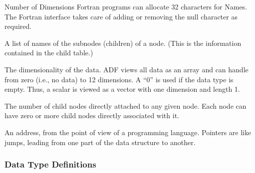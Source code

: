 \begin{Ventryi}{Number of Dimensions}
      Fortran programs can allocate 32 characters for Names.
      The Fortran interface takes care of adding or removing the null
      character as required.
\item [Names of Subnodes]
      A list of names of the subnodes (children) of a node.
      (This is the information contained in the child table.)
\item [Number of Dimensions]
      The dimensionality of the data.
      ADF views all data as an array and can handle from zero (i.e., no
      data) to 12 dimensions.
      A ``0'' is used if the data type is empty.
      Thus, a scalar is viewed as a vector with one dimension and
      length 1.
\item [Number of Subnodes]
      The number of child nodes directly attached to any given node.
      Each node can have zero or more child nodes directly associated
      with it.
\item [Pointer]
      An address, from the point of view of a programming language.
      Pointers are like jumps, leading from one part of the data
      structure to another.
\end{Ventryi}

\subsubsection{Data Type Definitions}

